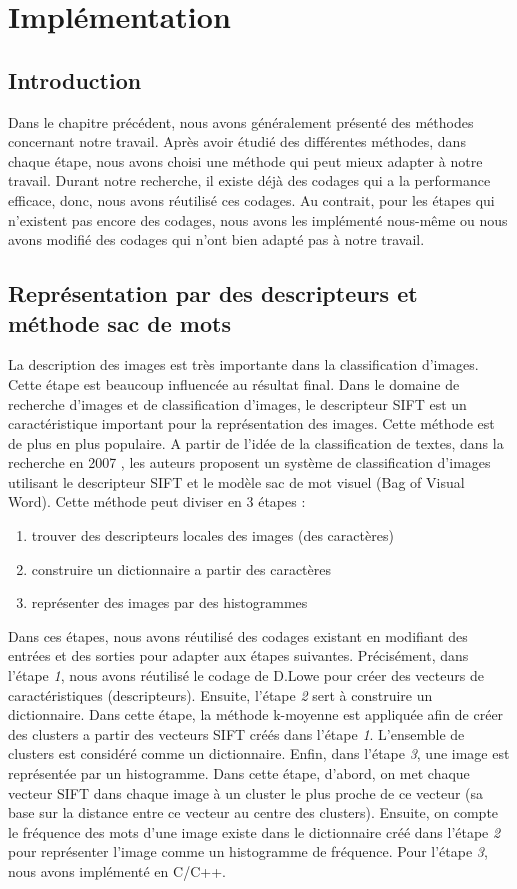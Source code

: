 \chapter{Implémentation}
\label{chap:impl}

\section{Introduction}
Dans le chapitre précédent, nous avons généralement présenté des méthodes concernant notre travail. Après avoir étudié des différentes méthodes, dans chaque étape, nous avons choisi une méthode qui peut mieux adapter à notre travail. Durant notre recherche, il existe déjà des codages qui a la performance efficace, donc, nous avons réutilisé ces codages. Au contrait, pour les étapes qui n'existent pas encore des codages, nous avons les implémenté nous-même ou nous avons modifié des codages qui n'ont bien adapté pas à notre travail.

\section{Représentation par des descripteurs et méthode sac de mots}
La description des images est très importante dans la classification d'images. Cette étape est beaucoup influencée au résultat final. Dans le domaine de recherche d'images et de classification d'images, le descripteur SIFT \cite{low04} est un caractéristique important pour la représentation des images. Cette méthode est de plus en plus populaire. A partir de l'idée de la classification de textes, dans la recherche en 2007 \cite{bos07}, les auteurs proposent un système de classification d'images utilisant le descripteur SIFT et le modèle sac de mot visuel (Bag of Visual Word). Cette méthode peut diviser en 3 étapes :
\begin{enumerate}
\item trouver des descripteurs locales des images (des caractères)
\item construire un dictionnaire a partir des caractères
\item représenter des images par des histogrammes
\end{enumerate}

Dans ces étapes, nous avons réutilisé des codages existant en modifiant des entrées et des sorties pour adapter aux étapes suivantes. Précisément, dans l'étape \textit{1}, nous avons réutilisé le codage de D.Lowe \cite{low99} pour créer des vecteurs de caractéristiques (descripteurs). Ensuite, l'étape \textit{2} sert à construire un dictionnaire. Dans cette étape, la méthode k-moyenne \cite{mq67} est appliquée afin de créer des clusters a partir des vecteurs SIFT créés dans l'étape \textit{1}. L'ensemble de clusters est considéré comme un dictionnaire. Enfin, dans l'étape \textit{3}, une image est représentée par un histogramme. Dans cette étape, d'abord, on met chaque vecteur SIFT dans chaque image à un cluster le plus proche de ce vecteur (sa base sur la distance entre ce vecteur au centre des clusters). Ensuite, on compte le fréquence des mots d'une image existe dans le dictionnaire créé dans l'étape \textit{2} pour représenter l'image comme un histogramme de fréquence. Pour l'étape \textit{3}, nous avons implémenté en C/C++.

